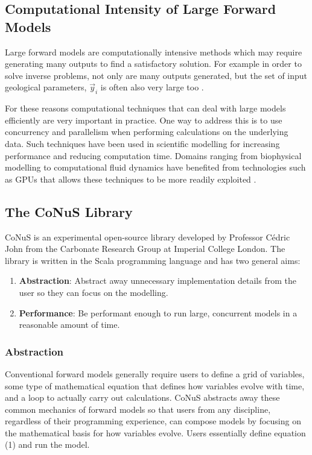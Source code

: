 \documentclass[12pt]{article}
\begin{document}
	\subsection{Computational Intensity of Large Forward Models}
	Large forward models are computationally intensive methods which may require generating many outputs to find a satisfactory solution. For example in order to solve inverse problems, not only are many outputs generated, but the set of input geological parameters, $\vec y_i$ is often also very large too \autocite{10.1260/0144598011492363}.
	
	For these reasons computational techniques that can deal with large models efficiently are very important in practice. One way to address this is to use concurrency and parallelism when performing calculations on the underlying data. Such techniques have been used in scientific modelling for increasing performance and reducing computation time. Domains ranging from biophysical modelling to computational fluid dynamics have benefited from technologies such as GPUs that allows these techniques to be more readily exploited \autocite{4490127}.
	
	\subsection{The CoNuS Library}
	CoNuS is an experimental open-source library developed by Professor Cédric John from the Carbonate Research Group at Imperial College London. The library is written in the Scala programming language and has two general aims:
	
	\begin{enumerate}
		\item \textbf{Abstraction}: Abstract away unnecessary implementation details from the user so they can focus on the modelling.
		\item \textbf{Performance}: Be performant enough to run large, concurrent models in a reasonable amount of time.
	\end{enumerate}
	
	\subsubsection{Abstraction}
	Conventional forward models generally require users to define a grid of variables, some type of mathematical equation that defines how variables evolve with time, and a loop to actually carry out calculations. CoNuS abstracts away these common mechanics of forward models so that users from any discipline, regardless of their programming experience, can compose models by focusing on the mathematical basis for how variables evolve. Users essentially define equation (1) and run the model.
	
\end{document}
